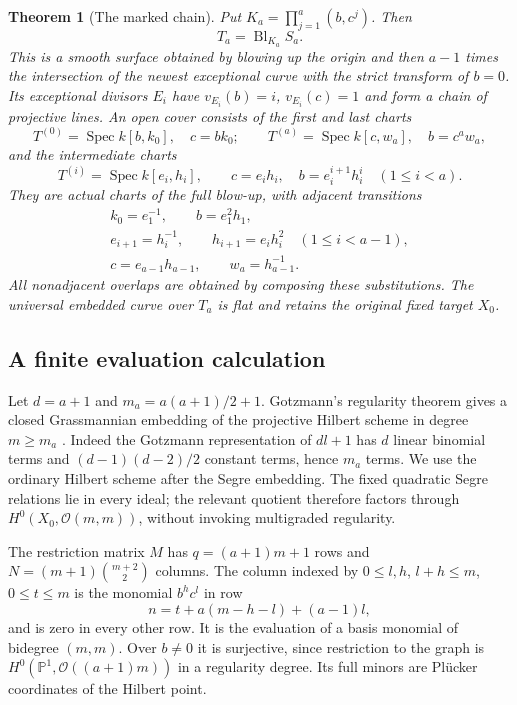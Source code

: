 \documentclass[11pt,reqno]{amsart}
\numberwithin{equation}{section}
\newtheorem{theorem}{Theorem}[section]
\theoremstyle{definition}\newtheorem{definition}[theorem]{Definition}
\theoremstyle{remark}\newtheorem{remark}[theorem]{Remark}
\newcommand{\Pj}{\mathbb P}\newcommand{\A}{\mathbb A}
\newcommand{\OO}{\mathcal O}\newcommand{\II}{\mathcal I}
\DeclareMathOperator{\Spec}{Spec}\DeclareMathOperator{\PGL}{PGL}
\begin{document}
\begin{theorem}[The marked chain]
\label{thm:chain-v171}
Put $K_a=\prod_{j=1}^a(b,c^j)$. Then
\begin{equation}\label{eq:chain-blowup-v171}
 T_a=\operatorname{Bl}_{K_a}S_a.
\end{equation}
This is a smooth surface obtained by blowing up the origin and then
$a-1$ times the intersection of the newest exceptional curve with
the strict transform of $b=0$. Its exceptional divisors $E_i$ have
$v_{E_i}(b)=i$, $v_{E_i}(c)=1$ and form a chain of projective lines.
An open cover consists of the first and last charts
\[
 T^{(0)}=\Spec k[b,k_0],\quad c=bk_0;
 \qquad T^{(a)}=\Spec k[c,w_a],\quad b=c^aw_a,
\]
and the intermediate charts
\begin{equation}\label{eq:chain-charts-v171}
 T^{(i)}=\Spec k[e_i,h_i],\qquad
 c=e_i h_i,\quad b=e_i^{i+1}h_i^i\quad(1\leq i<a).
\end{equation}
They are actual charts of the full blow-up, with adjacent transitions
\begin{equation}\label{eq:chain-overlaps-v171}
 \begin{gathered}
 k_0=e_1^{-1},\qquad b=e_1^2h_1,\\
 e_{i+1}=h_i^{-1},\qquad h_{i+1}=e_i h_i^2\quad(1\leq i<a-1),\\
 c=e_{a-1}h_{a-1},\qquad w_a=h_{a-1}^{-1}.
 \end{gathered}
\end{equation}
All nonadjacent overlaps are obtained by composing these substitutions.
The universal embedded curve over $T_a$ is flat and retains the original
fixed target $X_0$.
\end{theorem}

\subsection{A finite evaluation calculation}
Let $d=a+1$ and $m_a=a(a+1)/2+1$. Gotzmann's regularity theorem gives
a closed Grassmannian embedding of the projective Hilbert scheme in
degree $m\geq m_a$ \cite{Gotzmann171}. Indeed the Gotzmann
representation of $dl+1$ has $d$ linear binomial terms and
$(d-1)(d-2)/2$ constant terms, hence $m_a$ terms. We use the ordinary
Hilbert scheme after the Segre embedding. The fixed quadratic Segre
relations lie in every ideal; the relevant quotient therefore factors
through $H^0(X_0,\OO(m,m))$, without invoking multigraded regularity.

The restriction matrix $M$ has $q=(a+1)m+1$ rows and
$N=(m+1)\binom{m+2}{2}$ columns. The column indexed by
$0\leq l,h$, $l+h\leq m$, $0\leq t\leq m$ is the monomial
$b^hc^l$ in row
\[
 n=t+a(m-h-l)+(a-1)l,
\]
and is zero in every other row. It is the evaluation of a basis
monomial of bidegree $(m,m)$. Over $b\ne0$ it is surjective, since
restriction to the graph is $H^0(\Pj^1,\OO((a+1)m))$ in a regularity
degree. Its full minors are Pl\"ucker coordinates of the Hilbert point.
\end{document}
